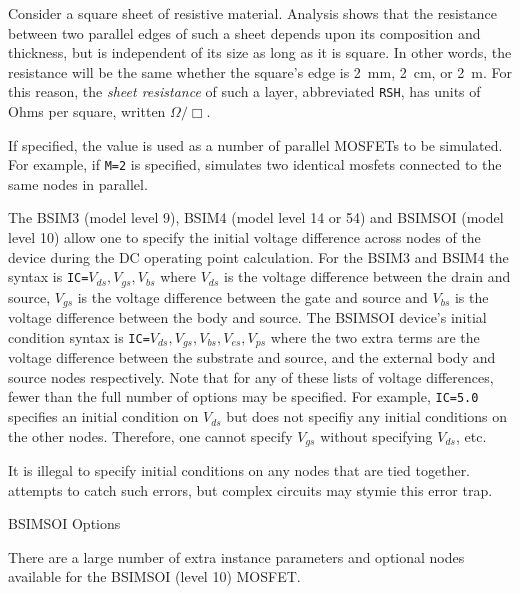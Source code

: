 \begin{Device}
\begin{Parameters}
Consider a square sheet of resistive material. Analysis shows that the
resistance between two parallel edges of such a sheet depends upon its
composition and thickness, but is independent of its size as long as it is
square. In other words, the resistance will be the same whether the square's
edge is 2~mm, 2~cm, or 2~m. For this reason, the \emph{sheet resistance} of
such a layer, abbreviated \texttt{RSH}, has units of Ohms per square,
written $\mathsf{\Omega}/\Box$.


If specified, the value is used as a number of parallel MOSFETs to be
simulated.  For example, if \texttt{M=2} is specified, \Xyce{} simulates two
identical mosfets connected to the same nodes in parallel.


The BSIM3 (model level 9), BSIM4 (model level 14 or 54) and BSIMSOI (model
level 10) allow one to specify the initial voltage difference across
nodes of the device during the DC operating point calculation.  For the
BSIM3 and BSIM4 the syntax is \texttt{IC=$V_{ds}, V_{gs}, V_{bs}$}
where $V_{ds}$ is the voltage difference between the drain and source,
$V_{gs}$ is the voltage difference between the gate and source and
$V_{bs}$ is the voltage difference between the body and source.  The
BSIMSOI device's initial condition syntax is \texttt{IC=$V_{ds},
  V_{gs}, V_{bs}, V_{es}, V_{ps}$} where the two extra terms are the
voltage difference between the substrate and source, and the external
body and source nodes respectively.  Note that for any of these lists of
voltage differences, fewer than the full number of options may be
specified.  For example, \texttt{IC=5.0} specifies an initial condition on $V_{ds}$
but does not specifiy any initial conditions on the other nodes.
Therefore, one cannot specify $V_{gs}$ without specifying $V_{ds}$, etc.

It is illegal to specify initial conditions on any nodes that are tied
together.  \Xyce{} attempts to catch such errors, but complex circuits may
stymie this error trap.

\end{Parameters}

\vbox{\hrulefill}
\item[BSIMSOI Options]

There are a large number of extra instance parameters and optional
nodes available for the BSIMSOI (level 10) MOSFET.

\begin{Parameters}


\end{Parameters}
\end{Device}
